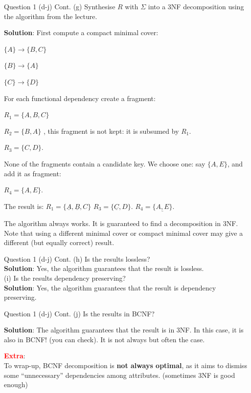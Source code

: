 \begin{frame}[fragile]{Question 1 (d-j) Cont.}
(g) Synthesise $R$ with $\Sigma$ into a 3NF decomposition using the algorithm from the lecture.\\\vspace{5pt}

\textbf{Solution}:
First compute a compact minimal cover:

$\{A\} \rightarrow \{B, C\}$

$\{B\} \rightarrow \{A\}$

$\{C\} \rightarrow \{D\}$

For each functional dependency create a fragment:

$R_1 = \{A, B, C\}$

$R_2 = \{B, A\}$ , this fragment is not kept: it is subsumed by $R_1$.

$R_3 = \{C, D\}$.

None of the fragments contain a candidate key. We choose one: say $\{A, E\}$, and add it as fragment:

$R_4 = \{A, E\}$.

The result is:
$R_1 = \{\underline{A}, \underline{B}, C\}$
$R_3 = \{\underline{C}, D\}$.
$R_4 = \{\underline{A, E}\}$.

The algorithm always works. It is guaranteed to find a decomposition in 3NF. Note that using a different minimal cover or compact minimal cover may give a different (but equally correct) result.
\end{frame}

\begin{frame}[fragile]{Question 1 (d-j) Cont.}
(h) Is the results lossless?\\\vspace{5pt}
\textbf{Solution}: Yes, the algorithm guarantees that the result is lossless.
\\\vspace{30pt}
(i) Is the results dependency preserving?\\\vspace{5pt}
\textbf{Solution}:
Yes, the algorithm guarantees that the result is dependency preserving.

\end{frame}

\begin{frame}[fragile]{Question 1 (d-j) Cont.}
(j) Is the results in BCNF?\\\vspace{5pt}

\textbf{Solution}:
The algorithm guarantees that the result is in 3NF. In this case, it is also in BCNF! (you can check). It is not always but often the case.\\\vspace{10pt}

\textcolor{red}{\textbf{Extra}}:\\
To wrap-up, BCNF decomposition is \textbf{not always optimal}, as it aims to dismiss some ``unnecessary'' dependencies among attributes. (sometimes 3NF is good enough)\\\vspace{5pt}
\end{frame}

